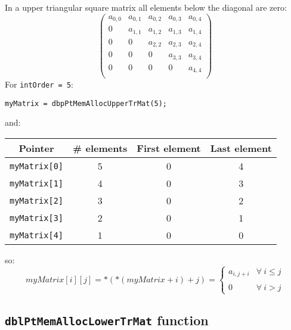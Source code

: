 In a upper triangular square matrix all elements below the diagonal are zero: 
%
\begin{displaymath}
\left( \begin{array}{ccccc}
  a_{0,0} & a_{0,1} & a_{0,2} & a_{0,3} & a_{0,4} \\
  0      & a_{1,1} & a_{1,2} & a_{1,3} & a_{1,4} \\ 
  0      & 0      & a_{2,2} & a_{2,3} & a_{2,4} \\
  0      & 0      & 0      & a_{3,3} & a_{3,4} \\
  0      & 0      & 0      & 0      & a_{4,4} \\
\end{array} \right)
\end{displaymath}
%
For \texttt{intOrder = 5}:
%
\begin{verbatim}
myMatrix = dbpPtMemAllocUpperTrMat(5);  
\end{verbatim}
%
and:
\begin{center}
  \begin{tabular}{|c|c|c|c|}
    \hline
    \textbf{Pointer} & \textbf{\# elements} & \textbf{First element} & \textbf{Last element}\\
    \hline
    \texttt{myMatrix[0]} & 5 & 0 & 4\\
    \hline
    \texttt{myMatrix[1]} & 4 & 0 & 3\\
    \hline
    \texttt{myMatrix[2]} & 3 & 0 & 2\\
    \hline
    \texttt{myMatrix[3]} & 2 & 0 & 1\\
    \hline
    \texttt{myMatrix[4]} & 1 & 0 & 0\\
    \hline
  \end{tabular}
\end{center}
%
so:
%
\begin{displaymath}
  myMatrix[i][j] = *(*(myMatrix + i) + j) = \left\{ \begin{array}{ll}
    a_{i,j+i} & \forall \ i \le j \\
     & \\
    0 & \forall \ i > j
    \end{array} \right.    
\end{displaymath}

\subsection{\texttt{dblPtMemAllocLowerTrMat} function} \label{sec:dblPtMemAllocLowerTrMat}


